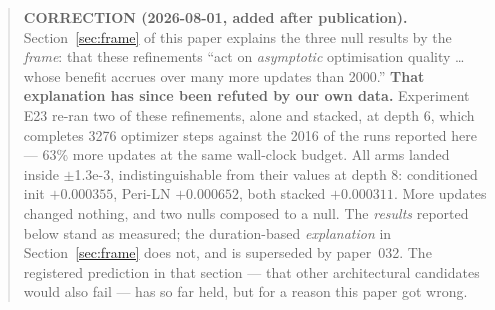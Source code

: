 \documentclass{article}
\begin{document}
\printAffiliationsAndNotice{}

\begin{abstract}
\textbf{CORRECTION (2026-08-01, added after publication).} Section~\ref{sec:frame} of this paper explains the three null results by the \emph{frame}: that these refinements ``act on \emph{asymptotic} optimisation quality \ldots whose benefit accrues over many more updates than 2000.'' \textbf{That explanation has since been refuted by our own data.} Experiment E23 re-ran two of these refinements, alone and stacked, at depth 6, which completes 3276 optimizer steps against the 2016 of the runs reported here --- 63\% more updates at the same wall-clock budget. All arms landed inside $\pm$1.3e-3, indistinguishable from their values at depth 8: conditioned init $+0.000355$, Peri-LN $+0.000652$, both stacked $+0.000311$. More updates changed nothing, and two nulls composed to a null. The \emph{results} reported below stand as measured; the duration-based \emph{explanation} in Section~\ref{sec:frame} does not, and is superseded by paper~032. The registered prediction in that section --- that other architectural candidates would also fail --- has so far held, but for a reason this paper got wrong.
\end{abstract}
\end{document}
